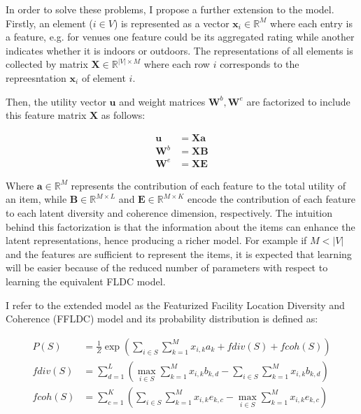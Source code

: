 In order to solve these problems, I propose a further extension to the model. Firstly, an element ($i \in V$) is represented as a vector $\mathbf{x}_{i} \in \mathbb{R}^{M}$ where each entry is a feature, e.g. for venues one feature could be its aggregated rating while another indicates whether it is indoors or outdoors. The representations of all elements is collected by matrix $\mathbf{X} \in \mathbb{R}^{|V| \times M}$ where each row $i$ corresponds to the repreesntation $\mathbf{x}_{i}$ of element $i$.

Then, the utility vector $\mathbf{u}$ and weight matrices $\mathbf{W}^{b}, \mathbf{W}^{e}$ are factorized to include this feature matrix $\mathbf{X}$ as follows:

\begin{align}
  \mathbf{u} &= \mathbf{Xa}   \label{eq:ffldc-factorization-1} \\
  \mathbf{W}^{b} &= \mathbf{XB}  \label{eq:ffldc-factorization-2} \\
  \mathbf{W}^{e} &= \mathbf{XE}
  \label{eq:ffldc-factorization-3}
\end{align} 

Where $\mathbf{a} \in \mathbb{R}^{M}$ represents the contribution of each feature to the total utility of an item, while $\mathbf{B} \in \mathbb{R}^{M \times L}$ and $\mathbf{E} \in \mathbb{R}^{M \times K}$ encode the contribution of each feature to each latent diversity and coherence dimension, respectively. The intuition behind this factorization is that the information about the items can enhance the latent representations, hence producing a richer model. For example if $M < |V|$ and the features are sufficient to represent the items, it is expected that learning will be easier because of the reduced number of parameters with respect to learning the equivalent FLDC model.

I refer to the extended model as the Featurized Facility Location Diversity and Coherence (FFLDC) model and its probability distribution is defined as:

\begin{align}
  \tag{FFLDC} \label{eq:ffldc}
  P(S) &= \frac{1}{Z}\exp{\left(\sum_{i \in S}{\sum_{k=1}^{M}x_{i,k}a_{k}} + fdiv(S) + fcoh(S)\right)} \\
  fdiv(S) &= \sum_{d=1}^{L}{\left(\max_{i \in S}{\sum_{k=1}^{M}x_{i,k}b_{k,d}} - \sum_{i \in S}{\sum_{k=1}^{M}x_{i,k}b_{k,d}}\right)} \\
  fcoh(S) &= \sum_{c=1}^{K}{\left(\sum_{i \in S}{\sum_{k=1}^{M}x_{i,k}e_{k,c}} - \max_{i \in S}{\sum_{k=1}^{M}x_{i,k}e_{k,c}}\right)}
\end{align}

